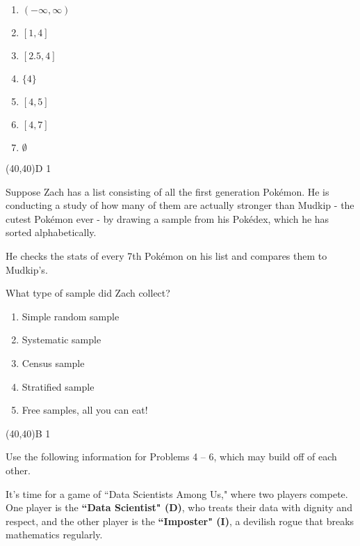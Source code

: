 \documentclass[addpoints]{exam}
\def\solutions{0}
\begin{document}
{\begin{questions}
\begin{minipage}[b]{.85\textwidth}
	\begin{enumerate}[label=\Alph*.]
		\item $(-\infty, \infty)$
		\item $[1,4]$
		\item $[2.5,4]$
		\item $\{4\}$
		\item $[4,5]$
		\item $[4,7]$
		\item $\emptyset$
	\end{enumerate}
\end{minipage}
\begin{minipage}[b]{.1\textwidth}
	\vspace{\fill}\framebox(40,40){D \if\solutions1 \fi}
\end{minipage}
%
\question[3]  Suppose Zach has a list consisting of all the first generation Pok\'emon. He is conducting a study of how many of them are actually stronger than Mudkip - the cutest Pok\'emon ever - by drawing a sample from his Pok\'edex, which he has sorted alphabetically.

He checks the stats of every 7th Pok\'emon on his list and compares them to Mudkip's.

What type of sample did Zach collect?
\vspace{2mm}

\begin{minipage}[b]{.85\textwidth}
	\begin{enumerate}[label=\Alph*.]
		\item Simple random sample
		\item Systematic sample
		\item Census sample
		\item Stratified sample
		\item Free samples, all you can eat!
	\end{enumerate}
\end{minipage}
\begin{minipage}[b]{.1\textwidth}
	\vspace{\fill}\framebox(40,40){B \if\solutions1 \fi}
\end{minipage}


\clearpage
\noindent Use the following information for Problems 4 -- 6, which may build off of each other.
\medskip

\noindent It's time for a game of ``Data Scientists Among Us," where two players compete. One player is the \textbf{``Data Scientist" (D)}, who treats their data with dignity and respect, and the other player is the \textbf{``Imposter" (I)}, a devilish rogue that breaks mathematics regularly.


\end{questions}}
\end{document}
